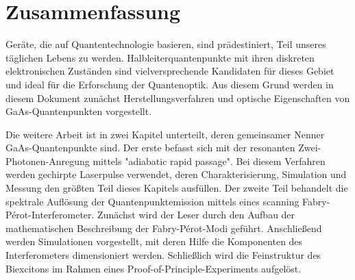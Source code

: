 
\chapter*{Zusammenfassung}
\label{cha:zusammenfassung}


Geräte, die auf Quantentechnologie basieren, sind prädestiniert, Teil unseres täglichen Lebens zu werden.
Halbleiterquantenpunkte mit ihren diskreten elektronischen Zuständen sind vielversprechende Kandidaten für dieses Gebiet und ideal für die Erforschung der Quantenoptik.
Aus diesem Grund werden in diesem Dokument zunächst Herstellungsverfahren und optische Eigenschaften von GaAs-Quantenpunkten vorgestellt.

Die weitere Arbeit ist in zwei Kapitel unterteilt, deren gemeinsamer Nenner GaAs-Quantenpunkte sind.
Der erste befasst sich mit der resonanten Zwei-Photonen-Anregung mittels "adiabatic rapid passage".
Bei diesem Verfahren werden gechirpte Laserpulse verwendet, deren Charakterisierung, Simulation und Messung den größten Teil dieses Kapitels ausfüllen.
Der zweite Teil behandelt die spektrale Auflösung der Quantenpunktemission mittels eines scanning Fabry-Pérot-Interferometer.
Zunächst wird der Leser durch den Aufbau der mathematischen Beschreibung der Fabry-Pérot-Modi geführt.
Anschließend werden Simulationen vorgestellt, mit deren Hilfe die Komponenten des Interferometers dimensioniert werden.
Schließlich wird die Feinstruktur des Biexcitons im Rahmen eines Proof-of-Principle-Experiments aufgelöst.


